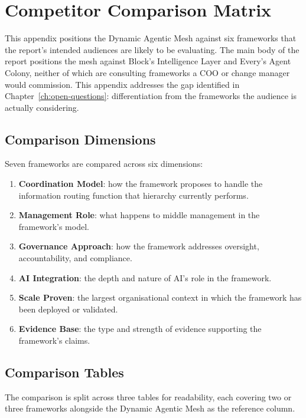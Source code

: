 \chapter{Competitor Comparison Matrix}
\label{ch:competitor-matrix}

This appendix positions the Dynamic Agentic Mesh against six frameworks that the report's intended audiences are likely to be evaluating. The main body of the report positions the mesh against Block's Intelligence Layer and Every's Agent Colony, neither of which are consulting frameworks a COO or change manager would commission. This appendix addresses the gap identified in Chapter~\ref{ch:open-questions}: differentiation from the frameworks the audience is actually considering.

\section{Comparison Dimensions}

Seven frameworks are compared across six dimensions:

\begin{enumerate}
  \item \textbf{Coordination Model}: how the framework proposes to handle the information routing function that hierarchy currently performs.
  \item \textbf{Management Role}: what happens to middle management in the framework's model.
  \item \textbf{Governance Approach}: how the framework addresses oversight, accountability, and compliance.
  \item \textbf{AI Integration}: the depth and nature of AI's role in the framework.
  \item \textbf{Scale Proven}: the largest organisational context in which the framework has been deployed or validated.
  \item \textbf{Evidence Base}: the type and strength of evidence supporting the framework's claims.
\end{enumerate}

\section{Comparison Tables}

The comparison is split across three tables for readability, each covering two or three frameworks alongside the Dynamic Agentic Mesh as the reference column.

